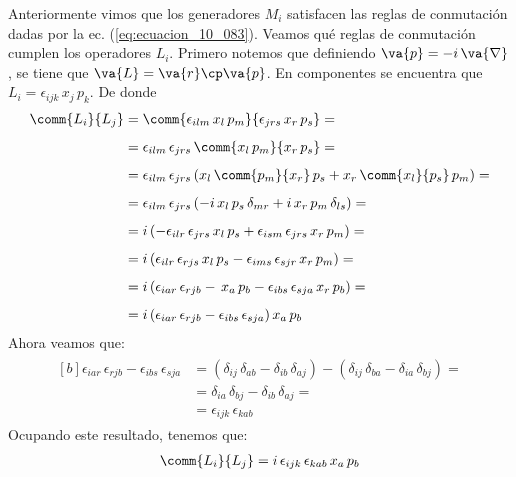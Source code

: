 Anteriormente vimos que los generadores $M_{i}$ satisfacen las reglas de conmutación dadas por la ec. (\ref{eq:ecuacion_10_083}). Veamos qué reglas de conmutación cumplen los operadores $L_{i}$. Primero notemos que definiendo $\va{p} = - i \, \va{\nabla}$, se tiene que $\va{L} = \va{r} \cp \va{p}$. En componentes se encuentra que $L_{i} = \epsilon_{ijk} \, x_{j} \, p_{k}$. De donde
\begin{align}
\begin{aligned}[b]
\comm{L_{i}}{L_{j}} &= \comm{\epsilon_{ilm} \, x_{l} \, p_{m}}{\epsilon_{jrs} \, x_{r} \, p_{s}} = \\[0.5em]
&= \epsilon_{ilm} \, \epsilon_{jrs} \, \comm{x_{l} \, p_{m}}{x_{r} \, p_{s}} = \\[0.5em]
&= \epsilon_{ilm} \, \epsilon_{jrs} \, (x_{l} \, \comm{p_{m}}{x_{r}} \, p_{s} + x_{r} \, \comm{x_{l}}{p_{s}} \, p_{m}) = \\[0.5em]
&= \epsilon_{ilm} \, \epsilon_{jrs} \, (- i \, x_{l} \, p_{s} \, \delta_{mr} + i \, x_{r} \, p_{m} \, \delta_{ls}) = \\[0.5em]
&= i \, (- \epsilon_{ilr} \, \epsilon_{jrs} \, x_{l} \, p_{s} + \epsilon_{ism} \, \epsilon_{jrs} \, x_{r} \, p_{m}) = \\[0.5em]
&= i \, (\epsilon_{ilr} \, \epsilon_{rjs} \, x_{l} \, p_{s} - \epsilon_{ims} \, \epsilon_{sjr} \, x_{r} \, p_{m}) = \\[0.5em]
&= i \, (\epsilon_{iar} \, \epsilon_{rjb} - \, x_{a} \, p_{b} - \epsilon_{ibs} \, \epsilon_{sja} \, x_{r} \, p_{b}) = \\[0.5em]
&= i \, (\epsilon_{iar} \, \epsilon_{rjb} - \epsilon_{ibs} \, \epsilon_{sja}) \, x_{a} \, p_{b}
\end{aligned}
\label{eq:ecuacion_10_103}
\end{align}
Ahora veamos que:
\begin{align}
\begin{aligned}[b]
\epsilon_{iar} \, \epsilon_{rjb} - \epsilon_{ibs} \, \epsilon_{sja} &= (\delta_{ij} \, \delta_{ab} - \delta_{ib} \, \delta_{aj}) - (\delta_{ij} \, \delta_{ba} - \delta_{ia} \, \delta_{bj}) = \\[0.5em]
&= \delta_{ia} \, \delta_{bj} - \delta_{ib} \, \delta_{aj} = \\[0.5em]
&= \epsilon_{ijk} \, \epsilon_{kab}
\end{aligned}
\label{eq:ecuacion_10_104}
\end{align}
Ocupando este resultado, tenemos que:
\begin{align*}
\comm{L_{i}}{L_{j}} = i \, \epsilon_{ijk} \, \epsilon_{kab} \, x_{a} \, p_{b}
\end{align*}

